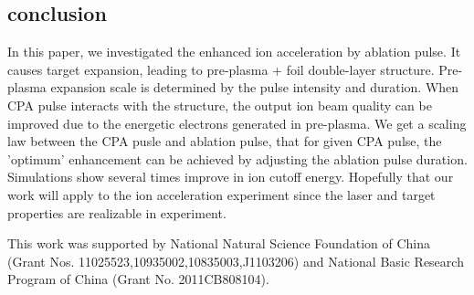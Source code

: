 \documentclass[aip,twocolumn,superscriptaddress,showpacs,amsmath]{revtex4}
\begin{document}


\subsection{conclusion}
In this paper, we investigated the enhanced ion acceleration by ablation
pulse. It causes target expansion, leading to pre-plasma + foil
double-layer structure. Pre-plasma expansion scale is determined by
the pulse intensity and duration. When CPA pulse interacts with the structure,
the output ion beam quality can be improved due to the energetic electrons generated in pre-plasma. 
We get a scaling law between the CPA pusle and ablation pulse, that for
given CPA pulse, the 'optimum' enhancement can be achieved by
adjusting the ablation pulse duration. Simulations show several times improve in ion cutoff energy.
Hopefully that our work will
apply to the ion acceleration experiment since the laser and target
properties are realizable in experiment.



\begin{acknowledgments}
This work was supported by National Natural Science Foundation of
China (Grant Nos. 11025523,10935002,10835003,J1103206) and National
Basic Research Program of China (Grant No. 2011CB808104).
\end{acknowledgments}


\end{document}
